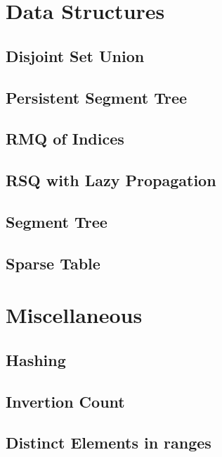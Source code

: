 \section{Data Structures}
\subsection{Disjoint Set Union}
\raggedbottom
\hrulefill
\subsection{Persistent Segment Tree}
\raggedbottom
\hrulefill
\subsection{RMQ of Indices}
\raggedbottom
\hrulefill
\subsection{RSQ with Lazy Propagation}
\raggedbottom
\hrulefill
\subsection{Segment Tree}
\raggedbottom
\hrulefill
\subsection{Sparse Table}
\raggedbottom
\hrulefill

\section{Miscellaneous}
\subsection{Hashing}
\raggedbottom
\hrulefill
\subsection{Invertion Count}
\raggedbottom
\hrulefill
\subsection{Distinct Elements in ranges}
\raggedbottom
\hrulefill
